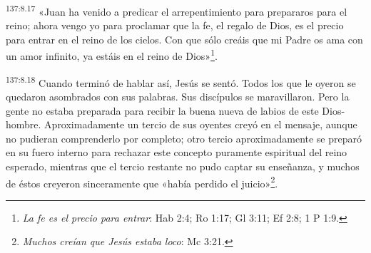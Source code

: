 \par
\textsuperscript{137:8.17} «Juan ha venido a predicar el arrepentimiento para prepararos para el reino; ahora vengo yo para proclamar que la fe, el regalo de Dios, es el precio para entrar en el reino de los cielos. Con que sólo creáis que mi Padre os ama con un amor infinito, ya estáis en el reino de Dios»\footnote{\textit{La fe es el precio para entrar}: Hab 2:4; Ro 1:17; Gl 3:11; Ef 2:8; 1 P 1:9.}.

\par
\textsuperscript{137:8.18} Cuando terminó de hablar así, Jesús se sentó. Todos los que le oyeron se quedaron asombrados con sus palabras. Sus discípulos se maravillaron. Pero la gente no estaba preparada para recibir la buena nueva de labios de este Dios-hombre. Aproximadamente un tercio de sus oyentes creyó en el mensaje, aunque no pudieran comprenderlo por completo; otro tercio aproximadamente se preparó en su fuero interno para rechazar este concepto puramente espiritual del reino esperado, mientras que el tercio restante no pudo captar su enseñanza, y muchos de éstos creyeron sinceramente que «había perdido el juicio»\footnote{\textit{Muchos creían que Jesús estaba loco}: Mc 3:21.}.